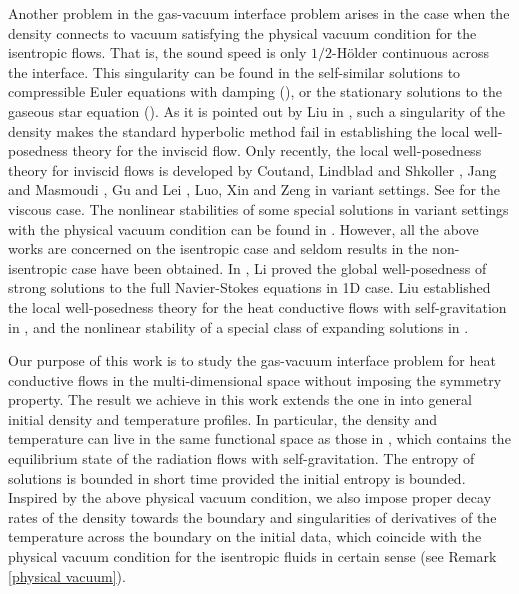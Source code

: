 \documentclass[12pt,a4paper]{amsart}
\numberwithin{equation}{section}
\theoremstyle{plain}
\theoremstyle{definition}
\begin{document}
Another problem in the gas-vacuum interface problem arises in the case  when the density connects to vacuum satisfying the physical vacuum condition for the isentropic flows. That is, the sound speed is only $1/2$-H\"older continuous across the interface. 
This singularity can be found in the self-similar solutions to compressible Euler equations with damping (\cite{Liu1996}), or the stationary solutions to the gaseous star equation (\cite{Chandrasekhar1957, Lin1997}). 
As it is pointed out by Liu in \cite{Liu1996}, such a singularity of the density makes the standard hyperbolic method fail in establishing the local well-posedness theory for the inviscid flow. Only recently, the local well-posedness theory for inviscid flows is developed by Coutand, Lindblad and Shkoller \cite{Coutand2010,Coutand2011,Coutand2012}, Jang and Masmoudi \cite{Jang2009,Jang2015}, Gu and Lei \cite{Gu2012,Gu2015}, Luo, Xin and Zeng \cite{Luo2014} in variant settings. 
See \cite{Jang2010, Duan2015a} for the viscous case.
The nonlinear stabilities of some special solutions in variant settings with the physical vacuum condition can be found in \cite{ Hadzic2016a,Hadzic2016,Liu2017a, Liu2018,Luo2016b, Luo2016a, Luo2016,Shkoller2017,Zeng2015,Zeng2017}. However, all the above works are concerned on the isentropic case and seldom results in the non-isentropic case have been obtained. In \cite{Li2018}, Li proved the global well-posedness of strong solutions to the full Navier-Stokes equations in 1D case. Liu established the local well-posedness theory for the heat conductive flows with self-gravitation in \cite{Liu2016a}, and the nonlinear stability of a special class of expanding solutions in \cite{Liu2018}. 

Our purpose of this work is to study the gas-vacuum interface problem for heat conductive flows in the multi-dimensional space without imposing the symmetry property. The result we achieve in this work extends the one in \cite{Liu2016a} into general initial density and temperature profiles. In particular, the density and temperature can live in the same functional space as those in \cite{Liu2016a}, which contains the equilibrium state of the radiation flows with self-gravitation. 
The entropy of solutions is bounded in short time provided the initial entropy is bounded. Inspired by the above physical vacuum condition, we also impose proper decay rates of the density towards the boundary and singularities of derivatives of the temperature across the boundary on the initial data, which coincide with the physical vacuum condition for the isentropic fluids in certain sense (see Remark \ref{physical vacuum}). 
\end{document}
